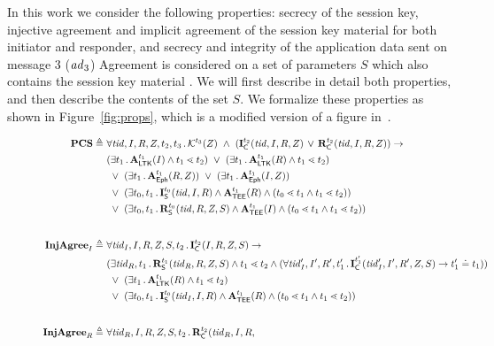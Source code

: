 In this work we consider the following properties: secrecy of the session key,
injective agreement and implicit agreement of the session key material for both
initiator and responder, and secrecy and integrity of the application data sent
on message 3 ($\mathit{ad}_3$)
%
Agreement is considered on a set of parameters $S$ which also contains the
session key material \mSessKey{}.
%
We will first describe in detail both properties, and then describe the
contents of the set $S$.
%
We formalize these properties as shown in Figure~\ref{fig:props}, which is
a modified version of a figure in~\cite{Norr21}.
\begin{figure*}[ht]
\begin{align*}
    \mPredPcs \triangleq\ & \forall \mTID, I, R, \mSessKey, t_2, t_3\mLogicDot
    \mK^{t_3}(\mSessKey)\  \land\ 
    (\mIComplete^{t_2}(\mTID, I, R, \mSessKey)\, \lor\, \mRComplete^{t_2}(\mTID, I, R, 
\mSessKey))
    \rightarrow\\
    &(\exists t_1\mLogicDot \mRevLTK^{t_1}(I) \land t_1 \lessdot t_2)
    \ \lor\ (\exists t_1\mLogicDot \mRevLTK^{t_1}(R) \land t_1 \lessdot t_2)\\
    &\ \lor\ (\exists t_1\mLogicDot \mRevEph^{t_1}(R, \mSessKey))
    \ \lor\ (\exists t_1\mLogicDot \mRevEph^{t_1}(I, \mSessKey))\\
    &\ \lor\ (\exists t_0, t_1\mLogicDot \mIStart^{t_0}(\mTID, I, R) \land \mTEE^{t_1}(R) \land (t_0 \lessdot t_1 \land t_1 \lessdot t_2))\\
    &\ \lor\ (\exists t_0, t_1\mLogicDot \mRStart^{t_0}(\mTID, R, \mSessKey, S) \land \mTEE^{t_1}(I) \land (t_0 \lessdot t_1 \land t_1 \lessdot t_2))\\[2em]
%
    \mPredInjI \triangleq\ &
    \forall \mTID_I, I, R, \mSessKey, S, t_2\mLogicDot \mIComplete^{t_2}(I, R, 
\mSessKey, S)
    \rightarrow\\
    &(\exists \mTID_R, t_1\mLogicDot \mRStart^{t_1}(\mTID_R, R, \mSessKey, S) \land t_1 \lessdot t_2
    \land (\forall \mTID_I', I', R', t_1' \mLogicDot \mIComplete^{t_1'}(\mTID_I', I' , R', \mSessKey, S)
        \rightarrow t_1' \doteq t_1))\\
    &\ \lor\ (\exists t_1\mLogicDot \mRevLTK^{t_1}(R) \land t_1 \lessdot t_2)\\
    &\ \lor\ (\exists t_0, t_1\mLogicDot \mIStart^{t_0}(\mTID_I, I, R) \land \mTEE^{t_1}(R) \land (t_0 \lessdot t_1 \land t_1 \lessdot t_2))\\[2em]
%
    \mPredInjR \triangleq\ &
    \forall \mTID_R, I, R, \mSessKey, S, t_2\mLogicDot \mRComplete^{t_2}(\mTID_R, I, R, 

\end{align*}
\end{figure*}
